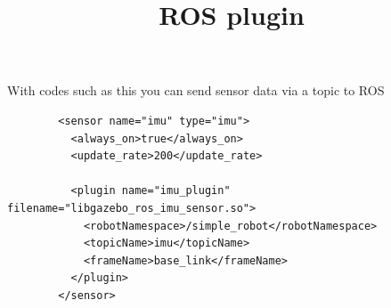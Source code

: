 \documentclass[a4paper]{article}
\title{ROS plugin}
\date{}
\begin{document}
    \maketitle
    With codes such as this you can send sensor data via a topic to ROS
    \begin{verbatim}
        <sensor name="imu" type="imu">
          <always_on>true</always_on>
          <update_rate>200</update_rate>
        
          <plugin name="imu_plugin" filename="libgazebo_ros_imu_sensor.so">
            <robotNamespace>/simple_robot</robotNamespace>
            <topicName>imu</topicName>
            <frameName>base_link</frameName>
          </plugin>
        </sensor>
    \end{verbatim}
\end{document}
